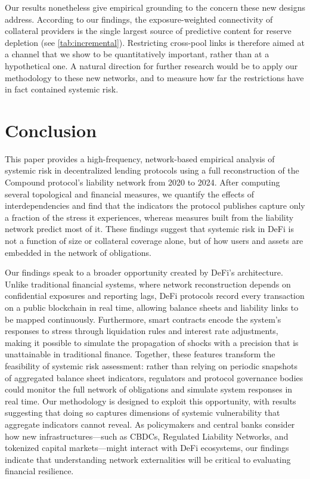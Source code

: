 \documentclass[a4paper,UKenglish,cleveref, autoref, thm-restate]{informs3}
\newcommand{\rev}[1]{{\color{purple}#1}}
\begin{document}
\rev{Our results nonetheless give empirical grounding to the concern
these new designs address. According to our findings, the exposure-weighted connectivity of
collateral providers is the single largest source of predictive
content for reserve depletion (see \autoref{tab:incremental}). Restricting
cross-pool links is therefore aimed at a channel that we show to be
quantitatively important, rather than at a hypothetical one. A natural
direction for further research would be to apply our methodology to these
new networks, and to measure how far the
restrictions have in fact contained systemic risk.}


\section{Conclusion}
\label{sec:conclusion}

This paper provides a high-frequency, network-based empirical analysis of systemic risk in decentralized lending protocols using a full reconstruction of the Compound protocol's liability network from 2020 to 2024. After computing several topological and financial measures, we quantify the effects of interdependencies and find that \rev{the indicators the protocol publishes capture only a fraction of the stress it experiences, whereas measures built from the liability network predict most of it}. These findings suggest that systemic risk in DeFi is not a function of size or collateral coverage alone, but of how users and assets are embedded in the network of obligations.

Our findings speak to a broader opportunity created by DeFi's architecture. Unlike traditional financial systems, where network reconstruction depends on confidential exposures and reporting lags, DeFi protocols record every transaction on a public blockchain in real time, allowing balance sheets and liability links to be mapped continuously. Furthermore, smart contracts encode the system's responses to stress through liquidation rules and interest rate adjustments, making it possible to simulate the propagation of shocks with a precision that is unattainable in traditional finance. Together, these features transform the feasibility of systemic risk assessment: rather than relying on periodic snapshots of aggregated balance sheet indicators, regulators and protocol governance bodies could monitor the full network of obligations and simulate system responses in real time. Our methodology is designed to exploit this opportunity, with results suggesting that doing so captures dimensions of systemic vulnerability that aggregate indicators cannot reveal. As policymakers and central banks consider how new infrastructures---such as CBDCs, Regulated Liability Networks, and tokenized capital markets---might interact with DeFi ecosystems, our findings indicate that understanding network externalities will be critical to evaluating financial resilience.
\end{document}
